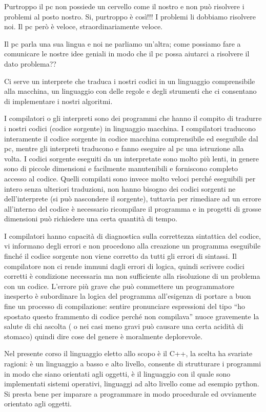 \documentclass[11pt,fleqn]{book} %
\begin{document}
Purtroppo il pc non possiede un cervello come il nostro e non può risolvere i problemi al posto nostro.
Si, purtroppo è così!!! I problemi li dobbiamo risolvere noi. Il pc però è veloce, straordinariamente veloce.

Il pc parla una sua lingua e noi ne parliamo un'altra; come possiamo fare a comunicare le nostre idee geniali in modo che il pc possa aiutarci a risolvere il dato problema??

Ci serve un interprete che traduca i nostri codici in un linguaggio comprensibile alla macchina, un linguaggio con delle regole e degli strumenti che ci consentano di implementare i nostri algoritmi.

I compilatori o gli interpreti sono dei programmi che hanno il compito di tradurre i nostri codici (codice sorgente) in linguaggio macchina. 
I compilatori traducono interamente il codice sorgente in codice macchina comprensibile ed eseguibile dal pc, mentre gli interpreti traducono e fanno eseguire al pc una istruzione alla volta. I codici sorgente eseguiti da un interpretate sono molto più lenti, in genere sono di piccole dimensioni e facilmente manutenibili e forniscono completo accesso al codice. Quelli compilati sono invece molto veloci perché eseguibili per intero senza ulteriori traduzioni, non hanno bisogno dei codici sorgenti ne dell'interprete (si può nascondere il sorgente), tuttavia per rimediare ad un errore all'interno del codice è necessario ricompilare il programma e in progetti di grosse dimensioni può richiedere una certa quantità di tempo.


I compilatori hanno capacità di diagnostica sulla correttezza sintattica del codice, vi informano degli errori e non procedono alla creazione un programma eseguibile finché il codice sorgente non viene corretto da tutti gli errori di sintassi. 
Il compilatore non ci rende immuni dagli errori di logica, quindi scrivere codici corretti è condizione necessaria ma non sufficiente alla risoluzione di un problema con un codice. L'errore più grave che può commettere un programmatore inesperto è subordinare la logica del programma all'esigenza di portare a buon fine un processo di compilazione: sentire pronunciare espressioni del tipo ``ho spostato questo frammento di codice perché non compilava'' nuoce gravemente la salute di chi ascolta ( o nei casi meno gravi può causare una certa acidità di stomaco) quindi dire cose del genere è moralmente deplorevole.

Nel presente corso il linguaggio eletto allo scopo è il C++, la scelta ha svariate ragioni: è un linguaggio a basso e alto livello, consente di strutturare i programmi in modo che siano orientati agli oggetti, è il linguaggio con il quale sono implementati sistemi operativi, linguaggi ad alto livello come ad esempio python. Si presta bene per imparare a programmare in modo procedurale ed ovviamente orientato agli oggetti.
\end{document}
